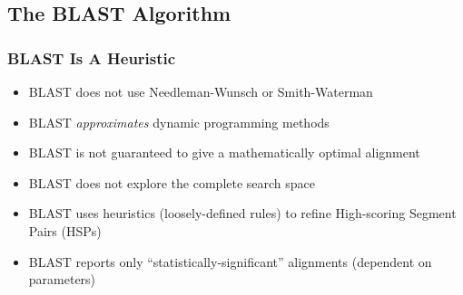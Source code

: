 %

\subsection{The BLAST Algorithm}


\begin{frame}
  \frametitle{BLAST Is A Heuristic}
  \begin{itemize}
    \item<1-> BLAST does not use Needleman-Wunsch or Smith-Waterman
    \item<1-> BLAST \emph{approximates} dynamic programming methods
    \item<1-> BLAST is not guaranteed to give a mathematically optimal alignment
    \item<2-> BLAST does not explore the complete search space
    \item<3-> BLAST uses heuristics (loosely-defined rules) to refine High-scoring Segment Pairs (HSPs)
    \item<4-> BLAST reports only ``statistically-significant'' alignments (dependent on parameters)
  \end{itemize}
\end{frame}

